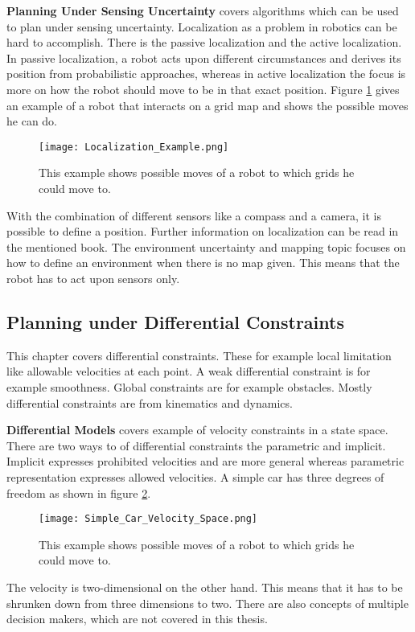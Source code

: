 \textbf{Planning Under Sensing Uncertainty} covers algorithms which can be used to plan under sensing uncertainty. Localization as a problem in robotics can be hard to accomplish. There is the passive localization and the active localization. In passive localization, a robot acts upon different circumstances and derives its position from probabilistic approaches, whereas in active localization the focus is more on how the robot should move to be in that exact position. Figure \ref{fig:Localization Example} gives an example of a robot that interacts on a grid map and shows the possible moves he can do. \cite{planning_algorithms_steven_m_lavalle}
\begin{figure}[H]
    \centering
    \texttt{[image: Localization\_Example.png]}
    \caption{This example shows possible moves of a robot to which grids he could move to. \cite{planning_algorithms_steven_m_lavalle}}
    \label{fig:Localization Example}
\end{figure}

With the combination of different sensors like a compass and a camera, it is possible to define a position. Further information on localization can be read in the mentioned book. The environment uncertainty and mapping topic focuses on how to define an environment when there is no map given. This means that the robot has to act upon sensors only. \cite{planning_algorithms_steven_m_lavalle}

\subsection{Planning under Differential Constraints} \label{sec:Planning under Differential Constraints}
This chapter covers differential constraints. These for example local limitation like allowable velocities at each point. A weak differential constraint is for example smoothness. Global constraints are for example obstacles. Mostly differential constraints are from kinematics and dynamics.

\textbf{Differential Models} covers example of velocity constraints in a state space. There are two ways to of differential constraints the parametric and implicit. Implicit expresses prohibited velocities and are more general whereas parametric representation expresses allowed velocities. A simple car has three degrees of freedom as shown in figure \ref{fig:Simple Car Velocity Space}.
\begin{figure}[H]
    \centering
    \texttt{[image: Simple\_Car\_Velocity\_Space.png]}
    \caption{This example shows possible moves of a robot to which grids he could move to. \cite{planning_algorithms_steven_m_lavalle}}
    \label{fig:Simple Car Velocity Space}
\end{figure}
The velocity is two-dimensional on the other hand. This means that it has to be shrunken down from three dimensions to two. There are also concepts of multiple decision makers, which are not covered in this thesis.

